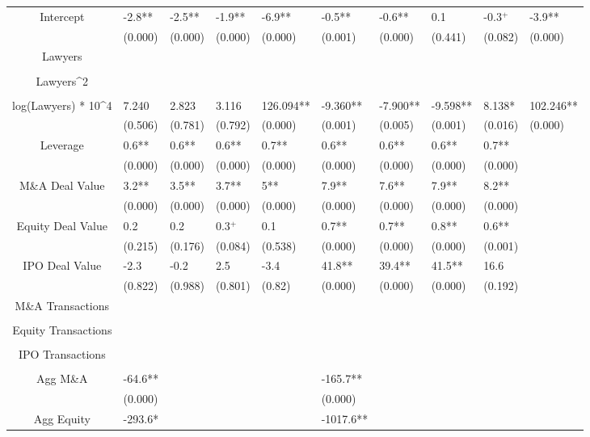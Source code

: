 \documentclass{article}
\begin{document}
\begin{table}[H]
\begin{tabular}{|clllllllll|}
Intercept & -2.8** & -2.5** & -1.9** & -6.9** & -0.5** & -0.6** & 0.1 & -0.3$^{+}$ & -3.9** \\ 
   & (0.000) & (0.000) & (0.000) & (0.000) & (0.001) & (0.000) & (0.441) & (0.082) & (0.000) \\ 
  Lawyers &  &  &  &  &  &  &  &  &  \\ 
   &  &  &  &  &  &  &  &  &  \\ 
  Lawyers^2 &  &  &  &  &  &  &  &  &  \\ 
   &  &  &  &  &  &  &  &  &  \\ 
  log(Lawyers) * 10^4 & 7.240 & 2.823 & 3.116 & 126.094** & -9.360** & -7.900** & -9.598** & 8.138* & 102.246** \\ 
   & (0.506) & (0.781) & (0.792) & (0.000) & (0.001) & (0.005) & (0.001) & (0.016) & (0.000) \\ 
  Leverage & 0.6** & 0.6** & 0.6** & 0.7** & 0.6** & 0.6** & 0.6** & 0.7** &  \\ 
   & (0.000) & (0.000) & (0.000) & (0.000) & (0.000) & (0.000) & (0.000) & (0.000) &  \\ 
  M\&A Deal Value & 3.2** & 3.5** & 3.7** & 5** & 7.9** & 7.6** & 7.9** & 8.2** &  \\ 
   & (0.000) & (0.000) & (0.000) & (0.000) & (0.000) & (0.000) & (0.000) & (0.000) &  \\ 
  Equity Deal Value & 0.2 & 0.2 & 0.3$^{+}$ & 0.1 & 0.7** & 0.7** & 0.8** & 0.6** &  \\ 
   & (0.215) & (0.176) & (0.084) & (0.538) & (0.000) & (0.000) & (0.000) & (0.001) &  \\ 
  IPO Deal Value & -2.3 & -0.2 & 2.5 & -3.4 & 41.8** & 39.4** & 41.5** & 16.6 &  \\ 
   & (0.822) & (0.988) & (0.801) & (0.82) & (0.000) & (0.000) & (0.000) & (0.192) &  \\ 
  M\&A Transactions &  &  &  &  &  &  &  &  &  \\ 
   &  &  &  &  &  &  &  &  &  \\ 
  Equity Transactions &  &  &  &  &  &  &  &  &  \\ 
   &  &  &  &  &  &  &  &  &  \\ 
  IPO Transactions &  &  &  &  &  &  &  &  &  \\ 
   &  &  &  &  &  &  &  &  &  \\ 
  Agg M\&A & -64.6** &  &  &  & -165.7** &  &  &  &  \\ 
   & (0.000) &  &  &  & (0.000) &  &  &  &  \\ 
  Agg Equity & -293.6* &  &  &  & -1017.6** &  &  &  &  \\ 

\end{tabular}
\end{table}
\end{document}
